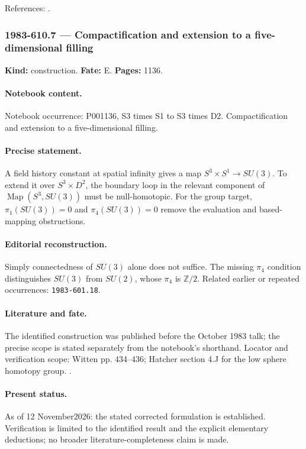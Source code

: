 \noindent References: \citep{witten1983current}.\par

\subsubsection{1983-610.7 --- Compactification and extension to a five-dimensional filling}

\label{item:1983-610.7}

\noindent\textbf{Kind:} construction. \textbf{Fate:} E. \textbf{Pages:} 1136.\par

\paragraph{Notebook content.} Notebook occurrence: P001136, S3 times S1 to S3 times D2. Compactification and extension to a five-dimensional filling.

\paragraph{Precise statement.} A field history constant at spatial infinity gives a map \(S^3\times S^1\to SU(3)\). To extend it over \(S^3\times D^2\), the boundary loop in the relevant component of \(\operatorname{Map}(S^3,SU(3))\) must be null-homotopic. For the group target, \(\pi_1(SU(3))=0\) and \(\pi_4(SU(3))=0\) remove the evaluation and based-mapping obstructions.

\paragraph{Editorial reconstruction.} Simply connectedness of \(SU(3)\) alone does not suffice. The missing \(\pi_4\) condition distinguishes \(SU(3)\) from \(SU(2)\), whose \(\pi_4\) is \(\mathbb Z/2\). Related earlier or repeated occurrences: \texttt{1983-601.18}.

\paragraph{Literature and fate.} The identified construction was published before the October 1983 talk; the precise scope is stated separately from the notebook's shorthand. Locator and verification scope: Witten pp. 434--436; Hatcher section 4.J for the low sphere homotopy group. \cite{witten1983current,hatcher2002algebraic}.

\paragraph{Present status.} As of 12 November2026: the stated corrected formulation is established. Verification is limited to the identified result and the explicit elementary deductions; no broader literature-completeness claim is made.

